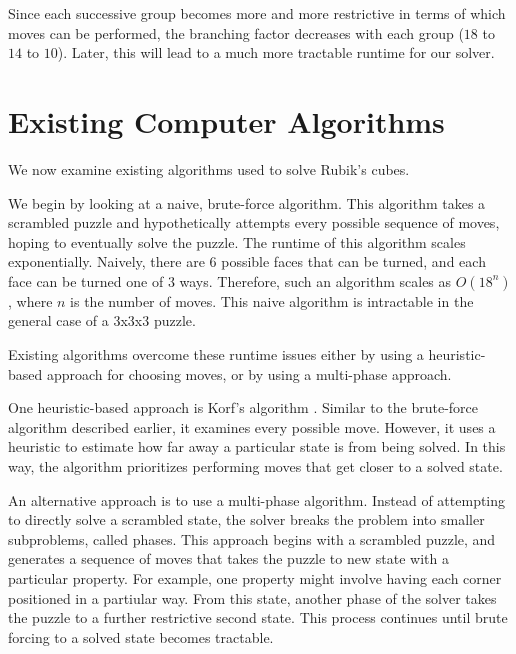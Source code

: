 \documentclass{article}
\begin{document}
Since each successive group becomes more and more restrictive in terms of which moves can be performed, the branching factor decreases with each group ($18$ to $14$ to $10$). Later, this will lead to a much more tractable runtime for our solver.


\section{Existing Computer Algorithms}

We now examine existing algorithms used to solve Rubik's cubes.

We begin by looking at a naive, brute-force algorithm. This algorithm takes a scrambled puzzle and hypothetically attempts every possible sequence of moves, hoping to eventually solve the puzzle. The runtime of this algorithm scales exponentially. Naively, there are $6$ possible faces that can be turned, and each face can be turned one of $3$ ways. Therefore, such an algorithm scales as $O(18^n)$, where $n$ is the number of moves. This naive algorithm is intractable in the general case of a 3x3x3 puzzle.

Existing algorithms overcome these runtime issues either by using a heuristic-based approach for choosing moves, or by using a multi-phase approach.

One heuristic-based approach is Korf's algorithm \cite{korf}. Similar to the brute-force algorithm described earlier, it examines every possible move. However, it uses a heuristic to estimate how far away a particular state is from being solved. In this way, the algorithm prioritizes performing moves that get closer to a solved state. 

An alternative approach is to use a multi-phase algorithm. Instead of attempting to directly solve a scrambled state, the solver breaks the problem into smaller subproblems, called phases. This approach begins with a scrambled puzzle, and generates a sequence of moves that takes the puzzle to new state with a particular property. For example, one property might involve having each corner positioned in a partiular way. From this state, another phase of the solver takes the puzzle to a further restrictive second state. This process continues until brute forcing to a solved state becomes tractable.
\end{document}
